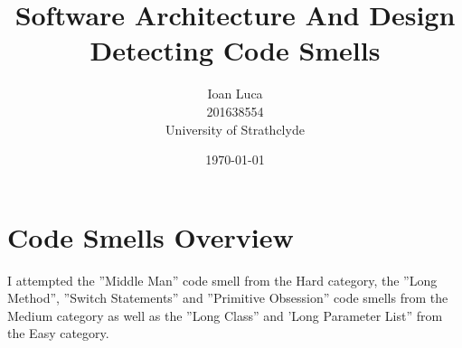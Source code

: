\documentclass[a4paper]{article}
\begin{document}
\title{Software Architecture And Design \\ Detecting Code Smells}
\author{Ioan Luca \\ \small 201638554 \\ \small University of Strathclyde}
\date{\today}
\maketitle











\section{Code Smells Overview}
I attempted the ''Middle Man'' code smell from the Hard category,
the ''Long Method'', ''Switch Statements'' and ''Primitive Obsession'' code smells
from the Medium category as well as
the ''Long Class'' and 'Long Parameter List'' from the Easy category.
\end{document}
